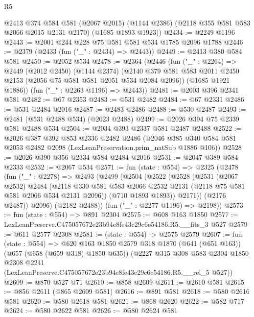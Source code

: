 \begin{lexlean}{R5}
\begin{coremodule}
    @2413
      @374
      @584
      @581
      (@2067 @2015)
      (@1144 @2386)
      (@2118 @355 @581 @583 @2066 @2015 @2131 @2170)
      (@1685 @1893 @1923))
@2434 := @2249 @1196
@2443 := @2001 @244 @228 @75 @581 @581 @534 @1785 @2096 @1788
@2446 := @2379 (@2433 (fun ("_" : @2434) => @2443))
@2449 := @2413 @380 @584 @581
@2450 := @2052 @534
@2478 := @2364
    (@2446
      (fun ("_" : @2264) =>
      @2449
        (@2012 @2450)
        (@1144 @2374)
        (@2140 @379 @581 @583 @2011 @2450 @2153 (@2056 @75 @581 @581 @2051 @534 @2084 @2096))
        (@1685 @1921 @1886))
      (fun ("_" : @2263 @1196) => @2443))
@2481 := @2003 @396 @2341 @581
@2482 := @67 @2353
@2483 := @531 @2482
@2484 := @67 @2331
@2486 := @531 @2484 @2016
@2487 := @2483 @2486
@2488 := @530 @2487
@2493 := @2481 (@531 @2488 @534) (@2023 @2488)
@2499 := @2026 @394 @75 @2339 @581 @2488 @534
@2504 := @2034 @393 @2337 @581 @2487 @2488
@2522 := @2026
    @387
    @392
    @853
    @2336
    @2482
    @2486
    (@2046 @385 @340 @584 @581 @2053 @2482 @2098 (LexLeanPreservation.prim_natSub @1886 @106))
@2528 := @2026 @390 @356 @2334 @584 @2484 @2016
@2531 := @2047 @389 @584 @2333
@2532 := @2067 @534
@2571 := fun (state : @554) =>
  @2325
    (@2478
      (fun ("_" : @2278) =>
      @2493
        (@2499
          (@2504
            (@2522
              (@2528
                (@2531
                  (@2067 @2532)
                  @2484
                  (@2118
                    @330
                    @581
                    @583
                    @2066
                    @2532
                    @2131
                    (@2118 @75 @581 @581 @2066 @534 @2131 @2096))
                  (@710 @1893 @1893))
                @2171))
            (@2176 @2487))
          @2096)
        (@2182 @2488))
      (fun ("_" : @2277 @1196) => @2198))
@2573 := fun (state : @554) => @891 @2304
@2575 := @608 @163 @1850
@2577 := LexLeanPreserve.C475057672e23b94e8fe43c29c6e54186.R5.__fits_3 @527
@2579 := @611 @2577 @2308
@2581 := (state : @554) -> @2575 @2579
@2607 := fun (state : @554) =>
  @620
    @163
    @1850
    @2579
    @318
    @1870
    (@641 (@651 @163))
    (@657 (@658 (@659 @318) @1850 @635))
    (@2227
      @315
      @308
      @583
      @2304
      @1850
      @2308
      @2241
      (LexLeanPreserve.C475057672e23b94e8fe43c29c6e54186.R5.__rel_5 @527))
@2609 := @870 @527 @71
@2610 := @858 @2609
@2611 := @2610 @581
@2615 := @856 @2611 (@865 @2609 @581)
@2616 := @891 @581
@2618 := @580 @2616 @581
@2620 := @580 @2618 @581
@2621 := @868 @2620
@2622 := @582 @717
@2624 := @580 @2622 @581
@2626 := @580 @2624 @581

\end{coremodule}
\end{lexlean}

